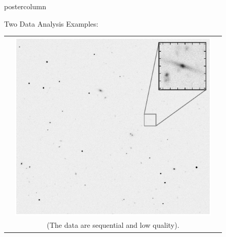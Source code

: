 \documentclass[final]{beamer}
\begin{document}
\begin{frame}
\begin{columns}
\begin{column}{.32\textwidth}
\begin{beamercolorbox}[center,wd=\textwidth]{postercolumn}
\begin{minipage}[T]{.95\textwidth}
{\begin{block}{Two Data Analysis Examples: }
\begin{table}
\begin{tabular}{c c c}
\begin{minipage}[c][2.5in][c]{6in}
                  \end{minipage} &
                  \begin{minipage}[c][2.5in][c]{6in}
                  \includegraphics[width=4in,trim=110 50 90 50,clip]{./figures/911to211zoom.eps}
                  \end{minipage} \\
            \multicolumn{3}{c}{\begin{minipage}[c][2in][c]{10in}
\textcolor{blue!75!white}{(The data are sequential and low quality).} \end{minipage}} \\




\end{tabular}
\end{table}
\end{block}}
\end{minipage}
\end{beamercolorbox}
\end{column}
\end{columns}
\end{frame}
\end{document}
